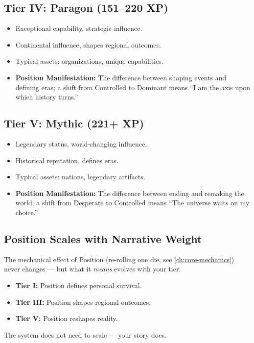 \subsection{Tier IV: Paragon (151--220 XP)}
\label{sec:tier-iv}
\begin{itemize}
\item Exceptional capability, strategic influence.
\item Continental influence, shapes regional outcomes.
\item Typical assets: organizations, unique capabilities.
\item \textbf{Position Manifestation:} The difference between shaping events and defining eras; a shift from Controlled to Dominant means ``I am the axis upon which history turns.''
\end{itemize}

\subsection{Tier V: Mythic (221+ XP)}
\label{sec:tier-v}
\begin{itemize}
\item Legendary status, world-changing influence.
\item Historical reputation, defines eras.
\item Typical assets: nations, legendary artifacts.
\item \textbf{Position Manifestation:} The difference between ending and remaking the world; a shift from Desperate to Controlled means ``The universe waits on my choice.''
\end{itemize}

\subsection{Position Scales with Narrative Weight}
\label{sec:position-narrative-weight}
The mechanical effect of Position (re-rolling one die, see \ref{ch:core-mechanics}) never changes --- but what it \textit{means} evolves with your tier:
\begin{itemize}
\item \textbf{Tier I:} Position defines personal survival.
\item \textbf{Tier III:} Position shapes regional outcomes.
\item \textbf{Tier V:} Position reshapes reality.
\end{itemize}
The system does not need to scale --- your story does.

